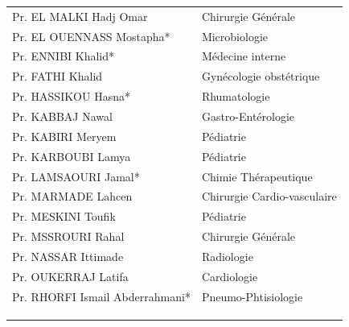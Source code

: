   \begin{table}[H]

    \begin{tabular}{l l}

  Pr. EL MALKI Hadj Omar & \hspace*{2em} Chirurgie Générale\\
  Pr. EL OUENNASS Mostapha* & \hspace*{2em} Microbiologie\\
  Pr. ENNIBI Khalid* & \hspace*{2em} Médecine interne\\
  Pr. FATHI Khalid	& \hspace*{2em} Gynécologie obstétrique \\
  Pr. HASSIKOU Hasna* & \hspace*{2em}Rhumatologie\\
  Pr. KABBAJ Nawal & \hspace*{2em} Gastro-Entérologie\\
  Pr. KABIRI Meryem & \hspace*{2em}Pédiatrie\\       
  Pr. KARBOUBI Lamya & \hspace*{2em} Pédiatrie\\
  Pr. LAMSAOURI Jamal* & \hspace*{2em} Chimie Thérapeutique \\       
  Pr. MARMADE Lahcen	 & \hspace*{2em} Chirurgie Cardio-vasculaire\\
  Pr. MESKINI Toufik & \hspace*{2em} Pédiatrie\\
  Pr. MSSROURI Rahal & \hspace*{2em} Chirurgie Générale\\       
  Pr. NASSAR Ittimade	 & \hspace*{2em} Radiologie\\
  Pr. OUKERRAJ Latifa & \hspace*{2em} Cardiologie \\       
  Pr. RHORFI Ismail Abderrahmani* & \hspace*{2em}Pneumo-Phtisiologie\\
    & \hspace*{2em} \\       
    & \hspace*{2em} \\
    & \hspace*{2em} \\

  \end{tabular}
    
\end{table}

